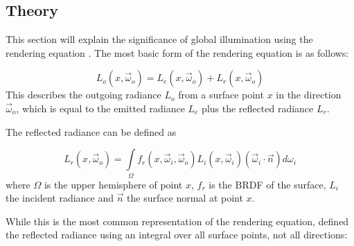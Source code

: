 \subsection{Theory}
\label{sec:intro:gi:theory}


\newcommand{\dir}{\vec\omega} %

\newcommand{\outgoingDir}{ \dir_o}
\newcommand{\incidenceDir}{\dir_i}

\newcommand{\outgoingRadiance}{  L_o(x, \outgoingDir)}
\newcommand{\emittedRadiance}{   L_e(x, \outgoingDir)}
\newcommand{\reflectedRadiance}{ L_r(x, \outgoingDir)}
\newcommand{\incidentRadiance}{  L_i(x, \incidenceDir)}

\newcommand{\brdf}{f_r} %

\newcommand{\surfaceNormal}{\vec{n}}

This section will explain the significance of global illumination using the rendering equation \citep{Kajiya:1986:RenderingEquation}. The most basic form of the rendering equation is as follows:

  \begin{equation}
    \outgoingRadiance = \emittedRadiance + \reflectedRadiance
  \label{eq:renderBasic}
  \end{equation}
\noindent
This describes the outgoing radiance $L_o$ from a surface point $x$ in the direction $\outgoingDir$, which is equal to the emitted radiance $L_e$ plus the reflected radiance $L_r$.

The reflected radiance can be defined as

  \begin{equation}
    \reflectedRadiance = \int\limits_{\Omega} \brdf(x, \incidenceDir, \outgoingDir)\incidentRadiance (\incidenceDir \cdot \surfaceNormal) d \omega_i
  \label{eq:render}
  \end{equation}
\noindent
where $\Omega$ is the upper hemisphere of point $x$, $\brdf$ is the BRDF of the surface, $L_i$ the incident radiance and $\surfaceNormal$ the surface normal at point $x$.

While this is the most common representation of the rendering equation, \citet{Kajiya:1986:RenderingEquation} defined the reflected radiance using an integral over all surface points, not all directions:

